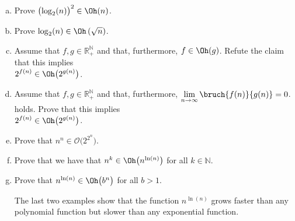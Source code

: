 \begin{enumerate}[(a)]
      \remark
      The previous exercise shows that, with respect to the big $\mathcal{O}$ notation, the base of
      a logarithm is not important because if $b > 1$ and $c > 1$, then $\log_{b}(n)$ and $ \log_{c}(n)$
      only differ by a constant factor.
\item Prove $\bigl(\log_2(n)\bigr)^2 \in \Oh(n)$.
\item Prove  $\log_2(n) \in \Oh\left(\sqrt{n}\right)$.
\item Assume that $f, g \in \mathbb{R}_+^\mathbb{N}$ and that, furthermore, $f \in \Oh(g)$.  
      Refute the claim that this implies 
      \\[0.2cm]
      \hspace*{1.3cm}
      $\displaystyle 2^{f(n)} \in \Oh\bigl(2^{g(n)}\bigr)$.
\item Assume that $f, g \in \mathbb{R}_+^\mathbb{N}$ and that, furthermore, 
      $\lim\limits_{n \rightarrow \infty} \bruch{f(n)}{g(n)} = 0$.  
      holds.
      Prove that this implies
      \\[0.2cm]
      \hspace*{1.3cm}
      $\displaystyle 2^{f(n)} \in \Oh\bigl(2^{g(n)}\bigr)$.
\item Prove that $n^n \in \mathcal{O}\bigl(2^{2^n}\bigr)$.
      \eox
\item Prove that we have that $n^k \in \Oh\bigl(n^{\ln(n)}\bigr)$ for all $k \in \mathbb{N}$. \eox
\item Prove that $n^{\ln(n)} \in \Oh\bigl(b^n\bigr)$ for all $b > 1$.  \eox

      \remark
      The last two examples show that the function $n^{\ln(n)}$ grows faster than any polynomial function but
      slower than any exponential function.
\end{enumerate}

